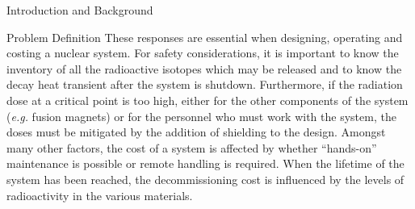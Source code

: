 \begin{chapter}{Introduction and Background}
\begin{section}{Problem Definition\label{sec:intro.prob_def}}
    These responses are essential when designing, operating and
    costing a nuclear system.  For safety considerations, it is
    important to know the inventory of all the radioactive isotopes
    which may be released and to know the decay heat transient after
    the system is shutdown.  Furthermore, if the radiation dose at a
    critical point is too high, either for the other components of the
    system (\textsl{e.g.} fusion magnets) or for the personnel who
    must work with the system, the doses must be mitigated by the
    addition of shielding to the design.  Amongst many other factors,
    the cost of a system is affected by whether ``hands-on''
    maintenance is possible or remote handling is required.  When the
    lifetime of the system has been reached, the decommissioning cost
    is influenced by the levels of radioactivity in the various
    materials.
  

\end{section}
\end{chapter}
